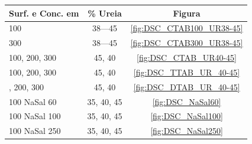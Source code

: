     \begin{table}[h]
            {%
            \begin{tabular}{l c c}
                \toprule
				Surf. e Conc. em \mM             & \% Ureia		 & Figura 			\\
    			\midrule
				\CTAB{} 100	                     & 38---45		 & \ref{fig:DSC_CTAB100_UR38-45}\\
				\CTAB{} 300	                     & 38---45		 & \ref{fig:DSC_CTAB300_UR38-45}\\
				\CTAB{} 100, 200, 300	             & 45, 40	     & \ref{fig:DSC_CTAB_UR40-45}	\\
				\TTAB{} 100, 200, 300	             & 45, 40	     & \ref{fig:DSC_TTAB_UR_40-45}	\\
				\DTAB 100, 200, 300	             & 45, 40	     & \ref{fig:DSC_DTAB_UR_40-45}	\\
    			\midrule
				\CTAB{} 100 NaSal 60	             & 35, 40, 45	 & \ref{fig:DSC_NaSal60}		\\
				\CTAB{} 100 NaSal 100	             & 35, 40, 45	 & \ref{fig:DSC_NaSal100}	\\
				\CTAB{} 100 NaSal 250	             & 35, 40, 45	 & \ref{fig:DSC_NaSal250}	\\
    			\bottomrule
            \end{tabular}%
            }{}
    \end{table}
	


